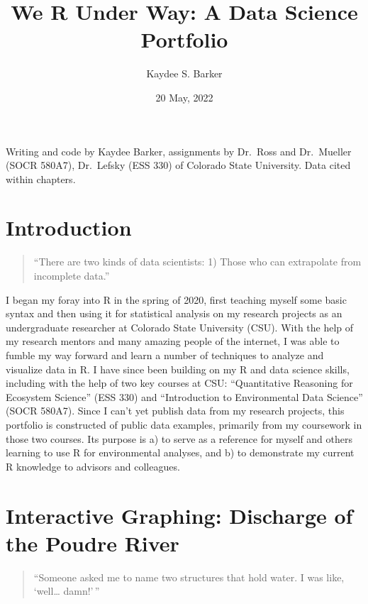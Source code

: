 \documentclass[
]{book}
\title{We R Under Way: A Data Science Portfolio}
\author{Kaydee S. Barker}
\date{20 May, 2022}
\begin{document}
\maketitle

{
\setcounter{tocdepth}{1}
\tableofcontents
}
Writing and code by Kaydee Barker, assignments by Dr.~Ross and Dr.~Mueller (SOCR 580A7), Dr.~Lefsky (ESS 330) of Colorado State University. Data cited within chapters.

\hypertarget{intro}{%
\chapter{Introduction}\label{intro}}

\begin{quote}
``There are two kinds of data scientists: 1) Those who can extrapolate from incomplete data.''
\end{quote}

I began my foray into R in the spring of 2020, first teaching myself some basic syntax and then using it for statistical analysis on my research projects as an undergraduate researcher at Colorado State University (CSU). With the help of my research mentors and many amazing people of the internet, I was able to fumble my way forward and learn a number of techniques to analyze and visualize data in R. I have since been building on my R and data science skills, including with the help of two key courses at CSU: ``Quantitative Reasoning for Ecosystem Science'' (ESS 330) and ``Introduction to Environmental Data Science'' (SOCR 580A7). Since I can't yet publish data from my research projects, this portfolio is constructed of public data examples, primarily from my coursework in those two courses. Its purpose is a) to serve as a reference for myself and others learning to use R for environmental analyses, and b) to demonstrate my current R knowledge to advisors and colleagues.

\hypertarget{interactive-graphing-discharge-of-the-poudre-river}{%
\chapter{Interactive Graphing: Discharge of the Poudre River}\label{interactive-graphing-discharge-of-the-poudre-river}}

\begin{quote}
``Someone asked me to name two structures that hold water. I was like, `well\ldots{} damn!'\,''
\end{quote}
\end{document}
